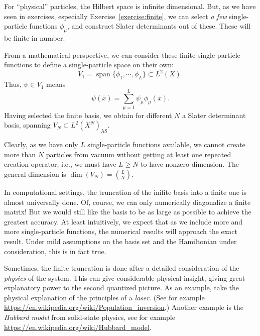 \documentclass{report}
\theoremstyle{plain}
\theoremstyle{definition}
\begin{document}
For ``physical'' particles, the Hilbert space is infinite
dimensional. But, as we have seen in exercises, especially
Exercise~\ref{exercise:finite}, we can select \emph{a few}
single-particle functions $\phi_\mu$, and construct Slater
determinants out of these. These will be finite in number.

From a mathematical perspective, we can consider these finite
single-particle functions to define a single-particle space on their
own:
\begin{equation}
  V_1 = \operatorname{span}\{\phi_1,\cdots,\phi_L\} \subset L^2(X).
\end{equation}
Thus, $\psi\in V_1$ means
\[ \psi(x) = \sum_{\mu=1}^L \psi_\mu \phi_\mu(x). \]
Having selected the finite basis, we obtain for different $N$ a Slater
determinant basis, spanning $V_N \subset L^2(X^N)_\text{AS}$.

Clearly, as we have only $L$ single-particle functions available, we
cannot create more than $N$ particles from vacuum without getting at
least one repeated creation operator, i.e., we must have $L \geq N$ to
have nonzero dimension. The general dimension is $\dim(V_N) =
\binom{L}{N}$.

In computational settings, the truncation of the inifite basis into a
finite one is almost universally done. Of, course, we can only
numerically diagonalize a finite matrix! But we would still like the
basis to be as large as possible to achieve the greatest accuracy. At
least intuitively, we expect that as we include more and more
single-particle functions, the numerical results will approach the
exact result. Under mild assumptions on the basis set and the
Hamiltonian under consideration, this is in fact true. 

Sometimes, the finite truncation is done after a detailed
consideration of the \emph{physics} of the system. This can give
considerable physical insight, giving great explanatory power to the
second quantized picture. As an example, take the physical explanation
of the principles of a \emph{laser}. (See for example
\url{https://en.wikipedia.org/wiki/Population_inversion}.) Another
example is the \emph{Hubbard model} from solid-state physics, see for example
\url{https://en.wikipedia.org/wiki/Hubbard_model}. 
\end{document}
